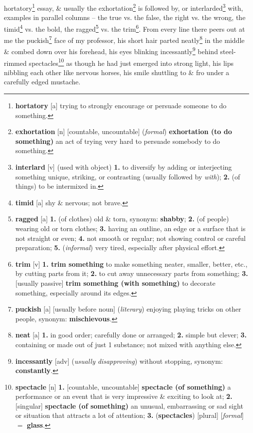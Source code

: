 \documentclass{article}
\begin{document}
hortatory\footnote{{\bf hortatory} [a] trying to strongly encourage or persuade someone to do something.} essay, \& usually the exhortation\footnote{{\bf exhortation} [n] [countable, uncountable] ({\it formal}) {\bf exhortation (to do something)} an act of trying very hard to persuade somebody to do something.} is followed by, or interlarded\footnote{{\bf interlard} [v] (used with object) {\bf 1.} to diversify by adding or interjecting something unique, striking, or contrasting (usually followed by {\it with}); {\bf 2.} (of things) to be intermixed in.} with, examples in parallel columns -- the true vs. the false, the right vs. the wrong, the timid\footnote{{\bf timid} [a] shy \& nervous; not brave.} vs. the bold, the ragged\footnote{{\bf ragged} [a] {\bf 1.} (of clothes) old \& torn, {\sc synonym}: {\bf shabby}; {\bf 2.} (of people) wearing old or torn clothes; {\bf 3.} having an outline, an edge or a surface that is not straight or even; {\bf 4.} not smooth or regular; not showing control or careful preparation; {\bf 5.} ({\it informal}) very tired, especially after physical effort.} vs. the trim\footnote{{\bf trim} [v] {\bf 1. trim something} to make something neater, smaller, better, etc., by cutting parts from it; {\bf 2.} to cut away unnecessary parts from something; {\bf 3.} [usually passive] {\bf trim something (with something)} to decorate something, especially around its edges.}. From every line there peers out at me the puckish\footnote{{\bf puckish} [a] [usually before noun] ({\it literary}) enjoying playing tricks on other people, {\sc synonym}: {\bf mischievous}.} face of my professor, his short hair parted neatly\footnote{{\bf neat} [a] {\bf 1.} in good order; carefully done or arranged; {\bf 2.} simple but clever; {\bf 3.} containing or made out of just 1 substance; not mixed with anything else.} in the middle \& combed down over his forehead, his eyes blinking incessantly\footnote{{\bf incessantly} [adv] ({\it usually disapproving}) without stopping, {\sc synonym}: {\bf constantly}.} behind steel-rimmed spectacles\footnote{{\bf spectacle} [n] {\bf 1.} [countable, uncountable] {\bf spectacle (of something)} a performance or an event that is very impressive \& exciting to look at; {\bf 2.} [singular] {\bf spectacle (of something)} an unusual, embarrassing or sad sight or situation that attracts a lot of attention; {\bf 3.} ({\bf spectacles}) [plural] [{\it formal}] $=$ {\bf glass}.} as though he had just emerged into strong light, his lips nibbling each other like nervous horses, his smile shuttling to \& fro under a carefully edged mustache.
\end{document}
